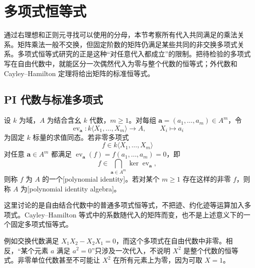 
\section{多项式恒等式}
\label{b2:sec:1903}

通过右理想和正则元寻找可以使用的分母，本节考察所有代入共同满足的乘法关系。矩阵乘法一般不交换，但固定阶数的矩阵仍满足某些共同的非交换多项式关系。多项式恒等式研究的正是这种“对任意代入都成立”的限制。把待检验的多项式写在自由代数中，就能区分一次偶然代入为零与整个代数的恒等式；外代数和 Cayley–Hamilton 定理将给出矩阵的标准恒等式。

%
%

\subsection{PI 代数与标准多项式}
\label{b2:subsec:1903:01}

\begin{definition}\label{b2:def:pi-algebra}
	设 \(k\) 为域，\(A\) 为结合含幺 \(k\) 代数，\(m\geq1\)。对每组 \(\mathbf a=(a_1,\ldots,a_m)\in A^m\)，令
	\[
		\operatorname{ev}_{\mathbf a}:k\langle X_1,\ldots,X_m\rangle\longrightarrow A, \qquad X_i\longmapsto a_i
	\]
	为固定 \(k\) 标量的求值同态。若非零多项式
	\[
		f\in k\langle X_1,\ldots,X_m\rangle
	\]
	对任意 \(\mathbf a\in A^m\) 都满足 \(\operatorname{ev}_{\mathbf a}(f)=f(a_1,\ldots,a_m)=0\)，即
	\[
		f\in\bigcap_{\mathbf a\in A^m}\ker\operatorname{ev}_{\mathbf a},
	\]
	则称 \(f\) 为 \(A\) 的一个[polynomial identity]。若对某个 \(m\geq1\) 存在这样的非零 \(f\)，则称 \(A\) 为[polynomial identity algebra]。
\end{definition}

这里讨论的是自由结合代数中的普通多项式恒等式，不把迹、约化迹等运算加入多项式。Cayley–Hamilton 等式中的系数随代入的矩阵而变，也不是上述意义下的一个固定多项式恒等式。

\ProseParagraphBreak
例如交换代数满足 \(X_1X_2-X_2X_1=0\)，而这个多项式在自由代数中非零。相反，“某个元素 \(a\) 满足 \(a^2=0\)”只涉及一次代入，不说明 \(X^2\) 是整个代数的恒等式。非零单位代数甚至不可能让 \(X^2\) 在所有元素上为零，因为可取 \(X=1\)。

